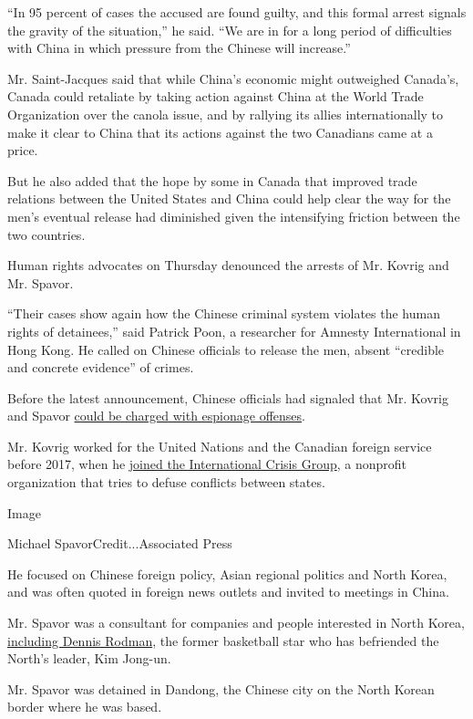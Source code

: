 ``In 95 percent of cases the accused are found guilty, and this formal
arrest signals the gravity of the situation,'' he said. ``We are in for
a long period of difficulties with China in which pressure from the
Chinese will increase.''

Mr. Saint-Jacques said that while China's economic might outweighed
Canada's, Canada could retaliate by taking action against China at the
World Trade Organization over the canola issue, and by rallying its
allies internationally to make it clear to China that its actions
against the two Canadians came at a price.

But he also added that the hope by some in Canada that improved trade
relations between the United States and China could help clear the way
for the men's eventual release had diminished given the intensifying
friction between the two countries.

Human rights advocates on Thursday denounced the arrests of Mr. Kovrig
and Mr. Spavor.

``Their cases show again how the Chinese criminal system violates the
human rights of detainees,'' said Patrick Poon, a researcher for Amnesty
International in Hong Kong. He called on Chinese officials to release
the men, absent ``credible and concrete evidence'' of crimes.

Before the latest announcement, Chinese officials had signaled that Mr.
Kovrig and Spavor
\href{https://www.nytimes.com/2019/03/04/world/asia/china-canada-michael-kovrig-huawei.html}{could
be charged with espionage offenses}.

Mr. Kovrig worked for the United Nations and the Canadian foreign
service before 2017, when he
\href{https://www.crisisgroup.org/who-we-are/people/michael-kovrig}{joined
the International Crisis Group}, a nonprofit organization that tries to
defuse conflicts between states.

Image

Michael SpavorCredit...Associated Press

He focused on Chinese foreign policy, Asian regional politics and North
Korea, and was often quoted in foreign news outlets and invited to
meetings in China.

Mr. Spavor was a consultant for companies and people interested in North
Korea,
\href{https://www.macleans.ca/news/world/kim-jong-un-meet-the-nhl/}{including
Dennis Rodman}, the former basketball star who has befriended the
North's leader, Kim Jong-un.

Mr. Spavor was detained in Dandong, the Chinese city on the North Korean
border where he was based.

